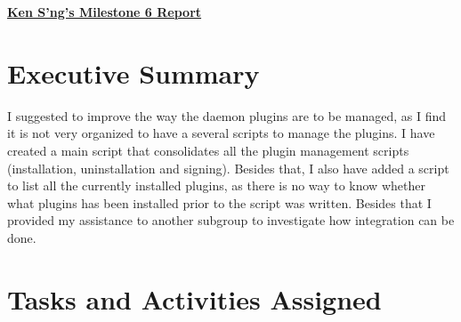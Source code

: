 \pagestyle{headings}

\begin{center}
{\large\textbf{\underline{{Ken S'ng's Milestone 6 Report}}}}
\end{center}

\section*{Executive Summary}

I suggested to improve the way the daemon plugins are to be managed, as I find it is not very organized to have a several scripts to manage the plugins. I have created a main script that consolidates all the plugin management scripts (installation, uninstallation and signing). Besides that, I also have added a script to list all the currently installed plugins, as there is no way to know whether what plugins has been installed prior to the script was written. Besides that I provided my assistance to another subgroup to investigate how integration can be done. 

\section*{Tasks and Activities Assigned}

